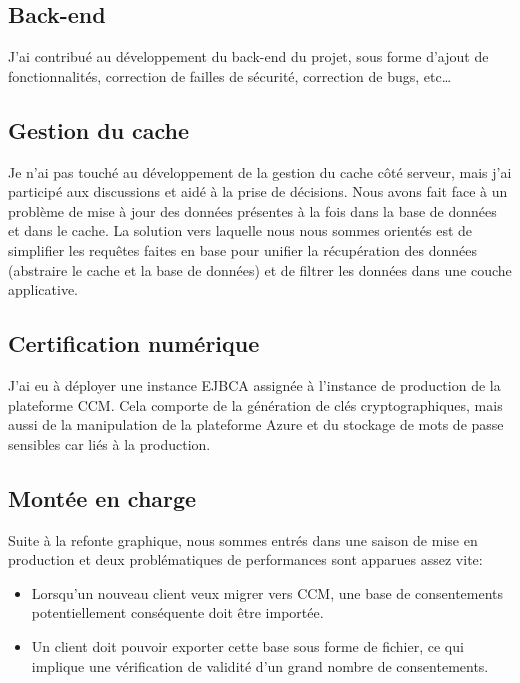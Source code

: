 \documentclass[12pt, a4paper]{report}
\newcommand\tab[1][1cm]{\hspace*{#1}}
\begin{document}
            \subsection{Back-end}
                J'ai contribué au développement du back-end du projet, sous forme d'ajout de fonctionnalités, correction de failles de sécurité, correction de bugs, etc\ldots
            \subsection{Gestion du cache}
                Je n'ai pas touché au développement de la gestion du cache côté serveur, mais j'ai participé aux discussions et aidé à la prise de décisions.
                Nous avons fait face à un problème de mise à jour des données présentes à la fois dans la base de données et dans le cache. La solution vers laquelle nous nous sommes orientés est de simplifier les requêtes faites en base pour unifier la récupération des données (abstraire le cache et la base de données) et de filtrer les données dans une couche applicative.
            \subsection{Certification numérique}
                J'ai eu à déployer une instance EJBCA assignée à l'instance de production de la plateforme CCM.\newline
                Cela comporte de la génération de clés cryptographiques, mais aussi de la manipulation de la plateforme Azure et du stockage de mots de passe sensibles car liés à la production.
            \subsection{Montée en charge}
                \tab{} Suite à la refonte graphique, nous sommes entrés dans une saison de mise en production et deux problématiques de performances sont apparues assez vite:
                \begin{itemize}
                \item Lorsqu'un nouveau client veux migrer vers CCM, une base de consentements potentiellement conséquente doit être importée.
                \item Un client doit pouvoir exporter cette base sous forme de fichier, ce qui implique une vérification de validité d'un grand nombre de consentements.
                \end{itemize}
\end{document}
